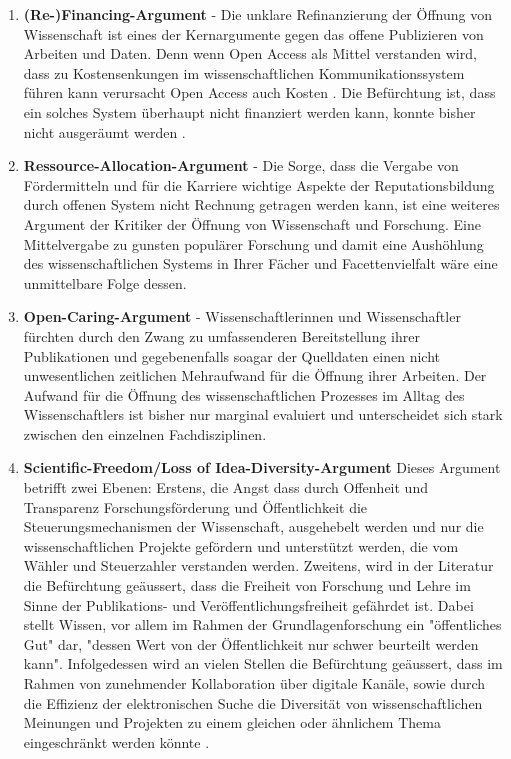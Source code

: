 \begin{enumerate}
\item \textbf{(Re-)Financing-Argument} - Die unklare Refinanzierung der Öffnung von Wissenschaft ist eines der Kernargumente gegen das offene Publizieren von Arbeiten und Daten. Denn wenn Open Access als Mittel verstanden wird, dass zu Kostensenkungen im wissenschaftlichen Kommunikationssystem führen kann verursacht Open Access auch Kosten \cite{muller_2010_open}. Die Befürchtung ist, dass ein solches System überhaupt nicht finanziert werden kann, konnte bisher nicht ausgeräumt werden \cite{weishaupt_2009_goldenOA}.
\item \textbf{Ressource-Allocation-Argument} - Die Sorge, dass die Vergabe von Fördermitteln und für die Karriere wichtige Aspekte der Reputationsbildung durch offenen System nicht Rechnung getragen werden kann, ist eine weiteres Argument der Kritiker der Öffnung von Wissenschaft und Forschung. Eine Mittelvergabe zu gunsten populärer Forschung und damit eine Aushöhlung des wissenschaftlichen Systems in Ihrer Fächer und Facettenvielfalt wäre eine unmittelbare Folge dessen.
\item \textbf{Open-Caring-Argument} - Wissenschaftlerinnen und Wissenschaftler fürchten durch den Zwang zu umfassenderen Bereitstellung ihrer Publikationen und gegebenenfalls soagar der Quelldaten einen nicht unwesentlichen zeitlichen Mehraufwand für die Öffnung ihrer Arbeiten. Der Aufwand für die Öffnung des wissenschaftlichen Prozesses im Alltag des Wissenschaftlers ist bisher nur marginal evaluiert \cite{osterloh2008anreize} und unterscheidet sich stark zwischen den einzelnen Fachdisziplinen.
\item \textbf{Scientific-Freedom/Loss of Idea-Diversity-Argument}
Dieses Argument betrifft zwei Ebenen: Erstens, die Angst dass durch Offenheit und Transparenz Forschungsförderung und Öffentlichkeit die Steuerungsmechanismen der Wissenschaft, ausgehebelt werden und nur die wissenschaftlichen Projekte gefördern und unterstützt werden, die vom Wähler und Steuerzahler verstanden werden. Zweitens, wird in der Literatur die Befürchtung geäussert, dass die Freiheit von Forschung und Lehre im Sinne der Publikations- und Veröffentlichungsfreiheit gefährdet ist\cite{Jochum_2009}. Dabei stellt Wissen, vor allem im Rahmen der Grundlagenforschung ein "öffentliches Gut" dar, "dessen Wert von der Öffentlichkeit nur schwer beurteilt werden kann"\cite{osterloh2008anreize}. Infolgedessen wird an vielen Stellen die Befürchtung geäussert, dass im Rahmen von zunehmender Kollaboration über digitale Kanäle, sowie durch die Effizienz der elektronischen Suche die Diversität von wissenschaftlichen Meinungen und Projekten zu einem gleichen oder ähnlichem Thema eingeschränkt werden könnte \cite{Evans_2008}.

\end{enumerate}
